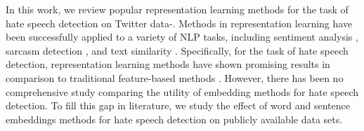 In this work, we review popular representation learning methods for the task of hate speech detection on Twitter data-. Methods in representation learning have been successfully applied to a variety of NLP tasks, including sentiment analysis \cite{tang2016sentiment}, sarcasm detection \cite{DBLP:conf/emnlp/JoshiTPBC16}, and text similarity \cite{DBLP:conf/acl/KenterBR16}. Specifically, for the task of hate speech detection, representation learning methods have shown promising results in comparison to traditional feature-based methods \cite{badjatiya2017deep,nobata2016abusive,djuric2015hate}. However, there has been no comprehensive study comparing the utility of embedding methods for hate speech detection. To fill this gap in literature, we study the effect of word and sentence embeddings methods for hate speech detection on publicly available data sets.
